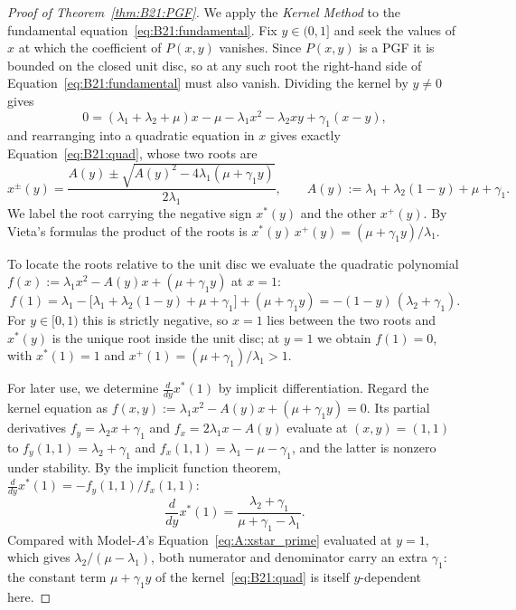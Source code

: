\begin{proof}[Proof of Theorem~\ref{thm:B21:PGF}]

We apply the \emph{Kernel Method} to the fundamental equation~\eqref{eq:B21:fundamental}. Fix $y\in(0,1]$ and seek the values of $x$ at which the coefficient of $P(x,y)$ vanishes. Since $P(x,y)$ is a PGF it is bounded on the closed unit disc, so at any such root the right-hand side of Equation~\eqref{eq:B21:fundamental} must also vanish. Dividing the kernel by $y\ne0$ gives
\begin{equation*}
    0 = (\lambda_1+\lambda_2+\mu)x - \mu - \lambda_1 x^2 - \lambda_2 xy + \gamma_1(x-y),
\end{equation*}
and rearranging into a quadratic equation in $x$ gives exactly Equation~\eqref{eq:B21:quad}, whose two roots are
\begin{equation*}
    x^{\pm}(y) = \frac{A(y) \pm \sqrt{A(y)^2 - 4\lambda_1(\mu+\gamma_1 y)}}{2\lambda_1},
    \qquad A(y):=\lambda_1+\lambda_2(1-y)+\mu+\gamma_1.
\end{equation*}
We label the root carrying the negative sign $x^*(y)$ and the other
$x^+(y)$. By Vieta's formulas the product of the roots is $x^*(y)\,x^+(y)=(\mu+\gamma_1 y)/\lambda_1$.

To locate the roots relative to the unit disc we evaluate the quadratic polynomial
$f(x):=\lambda_1 x^2 - A(y)x + (\mu+\gamma_1 y)$ at $x=1$:
\begin{equation*}
    f(1) = \lambda_1 - \bigl[\lambda_1+\lambda_2(1-y)+\mu+\gamma_1\bigr] + (\mu+\gamma_1 y)
         = -(1-y)\,(\lambda_2+\gamma_1).
\end{equation*}
For $y\in[0,1)$ this is strictly negative, so $x=1$ lies between the two roots and $x^*(y)$ is the unique root inside the unit disc; at $y=1$ we obtain $f(1)=0$, with $x^*(1)=1$ and $x^+(1)=(\mu+\gamma_1)/\lambda_1>1$.

For later use, we determine $\tfrac{d}{dy}x^*(1)$ by implicit differentiation. Regard the kernel equation as $f(x,y):=\lambda_1 x^2-A(y)x+(\mu+\gamma_1 y)=0$. Its partial derivatives $f_y=\lambda_2 x+\gamma_1$ and $f_x=2\lambda_1 x-A(y)$ evaluate at $(x,y)=(1,1)$ to
$f_y(1,1)=\lambda_2+\gamma_1$ and $f_x(1,1)=\lambda_1-\mu-\gamma_1$, and the latter is nonzero under stability. By the implicit function theorem, $\tfrac{d}{dy}x^*(1)=-f_y(1,1)/f_x(1,1)$:
\begin{equation}
    \frac{d}{dy}x^*(1) = \frac{\lambda_2+\gamma_1}{\mu+\gamma_1-\lambda_1}.
    \label{eq:B21:xstar_deriv}
\end{equation}
Compared with Model-$A$'s Equation~\eqref{eq:A:xstar_prime} evaluated at $y=1$, which gives $\lambda_2/(\mu-\lambda_1)$, both numerator and denominator carry an extra $\gamma_1$: the constant term $\mu+\gamma_1 y$ of the kernel~\eqref{eq:B21:quad} is itself $y$-dependent here.


\end{proof}
